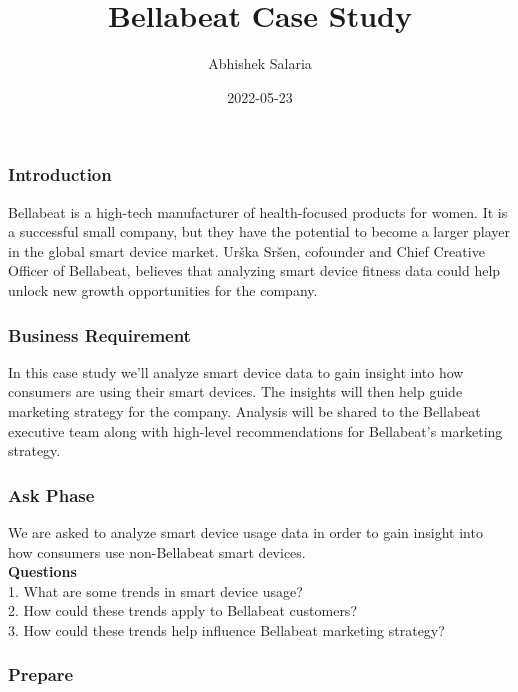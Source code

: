 \documentclass[
]{article}
\title{Bellabeat Case Study}
\author{Abhishek Salaria}
\date{2022-05-23}
\begin{document}
\maketitle

\hypertarget{introduction}{%
\subsubsection{Introduction}\label{introduction}}

Bellabeat is a high-tech manufacturer of health-focused products for
women. It is a successful small company, but they have the potential to
become a larger player in the global smart device market. Urška Sršen,
cofounder and Chief Creative Officer of Bellabeat, believes that
analyzing smart device fitness data could help unlock new growth
opportunities for the company.

\hypertarget{business-requirement}{%
\subsubsection{Business Requirement}\label{business-requirement}}

In this case study we'll analyze smart device data to gain insight into
how consumers are using their smart devices. The insights will then help
guide marketing strategy for the company. Analysis will be shared to the
Bellabeat executive team along with high-level recommendations for
Bellabeat's marketing strategy.

\hypertarget{ask-phase}{%
\subsubsection{Ask Phase}\label{ask-phase}}

We are asked to analyze smart device usage data in order to gain insight
into how consumers use non-Bellabeat smart devices.\\
\textbf{Questions}\\
1. What are some trends in smart device usage?\\
2. How could these trends apply to Bellabeat customers?\\
3. How could these trends help influence Bellabeat marketing strategy?\\

\hypertarget{prepare}{%
\subsubsection{Prepare}\label{prepare}}
\end{document}
